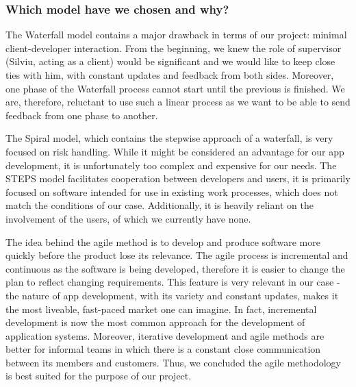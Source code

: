 \subsubsection{Which model have we chosen and why?}
The Waterfall model contains a major drawback in terms of our project: minimal client-developer interaction. From the beginning, we knew the role of supervisor (Silviu, acting as a client) would be significant and we would like to keep close ties with him, with constant updates and feedback from both sides. Moreover, one phase of the Waterfall process cannot start until the previous is finished. We are, therefore, reluctant to use such a linear process as we want to be able to send feedback from one phase to another.

The Spiral model, which contains the stepwise approach of a waterfall, is very focused on risk handling. While it might be considered an advantage for our app development, it is unfortunately too complex and expensive for our needs. The STEPS model facilitates cooperation between developers and users, it is primarily focused on software intended for use in existing work processes, which does not match the conditions of our case. Additionally, it is heavily reliant on the involvement of the users, of which we currently have none.

The idea behind the agile method is to develop and produce software more quickly before the product lose its relevance. The agile process is incremental and continuous as the software is being developed, therefore it is easier to change the plan to reflect changing requirements. This feature is very relevant in our case - the nature of app development, with its variety and constant updates, makes it the most liveable, fast-paced market one can imagine. In fact, incremental development is now the most common approach for the development of application systems. Moreover, iterative development and agile methods are better for informal teams in which there is a constant close communication between its members and customers. Thus, we concluded the agile methodology is best suited for the purpose of our project.

